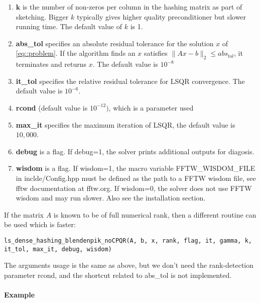 \documentclass[english,11pt]{article}
\begin{document}
\begin{itemize}
\begin{enumerate}
			\item $\mathbf k$ is the number of non-zeros per column in the hashing matrix as part of sketching. Bigger $k$ typically gives higher quality preconditioner but slower running time. The default value of $k$ is 1. 

			\item {\bf abs_tol} specifies an absolute residual tolerance for the solution $x$ of \ref{eq::problem}. If the algorithm finds an $x$ satisfies $\|Ax-b\|_2 \leq abs_{tol}$, it terminates and returns $x$. The default value is $10^{-8}$

			\item {\bf it_tol} specifies the relative residual tolerance for LSQR convergence. The default value is $10^{-6}$.
			
			\item {\bf rcond} (default value is $10^{-12})$, which is a parameter used

			 \item {\bf max_it} specifies the maximum iteration of LSQR, the default value is $10,000$. 


			 \item {\bf debug} is a flag. If debug=1, the solver prints additional outputs for diagosis. 

			 \item {\bf wisdom} is a flag. If wisdom=1, the macro variable FFTW_WISDOM_FILE in inclde/Config.hpp must be defined as the path to a FFTW wisdom file, see fftw documentation at fftw.org. If wisdom=0, the solver does not use FFTW wisdom and may run slower. Also see the installation section.
		\end{enumerate}
		

	\end{itemize}


If the matrix $A$ is known to be of full numerical rank, then a different routine can be used which is faster:

{\tt ls_dense_hashing_blendenpik_noCPQR(A, b, x, rank, flag, it, gamma, k, it_tol, max_it, debug, wisdom)}

The arguments usage is the same as above, but we don't need the rank-detection parameter rcond, and the shortcut related to abs_tol is not implemented.

\paragraph{Example}
\end{document}

